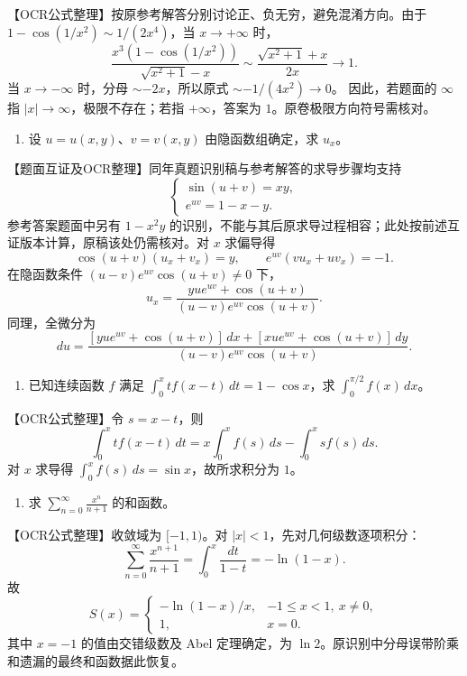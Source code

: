 \documentclass[11pt,fontset=fandol]{ctexart}
\providecommand{\tightlist}{\setlength{\itemsep}{0pt}\setlength{\parskip}{0pt}}
\begin{document}
【OCR公式整理】按原参考解答分别讨论正、负无穷，避免混淆方向。由于
\(1-\cos(1/x^2)\sim1/(2x^4)\)，当 \(x\to+\infty\) 时， \[
\frac{x^3(1-\cos(1/x^2))}{\sqrt{x^2+1}-x}
\sim\frac{\sqrt{x^2+1}+x}{2x}\longrightarrow1.
\] 当 \(x\to-\infty\) 时，分母 \(\sim-2x\)，所以原式
\(\sim-1/(4x^2)\to0\)。 因此，若题面的 \(\infty\) 指
\(|x|\to\infty\)，极限不存在；若指 \(+\infty\)，答案为
\(1\)。原卷极限方向符号需核对。

\begin{enumerate}
\def\labelenumi{\arabic{enumi}.}
\setcounter{enumi}{1}
\tightlist
\item
  设 \(u=u(x,y)\)、\(v=v(x,y)\) 由隐函数组确定，求 \(u_x\)。
\end{enumerate}

【题面互证及OCR整理】同年真题识别稿与参考解答的求导步骤均支持 \[
\begin{cases}\sin(u+v)=xy,\\e^{uv}=1-x-y.\end{cases}
\] 参考答案题面中另有 \(1-x^2y\)
的识别，不能与其后原求导过程相容；此处按前述互证版本计算，原稿该处仍需核对。对
\(x\) 求偏导得 \[
\cos(u+v)(u_x+v_x)=y,\qquad
e^{uv}(vu_x+uv_x)=-1.
\] 在隐函数条件 \((u-v)e^{uv}\cos(u+v)\ne0\) 下， \[
u_x=\frac{yu e^{uv}+\cos(u+v)}{(u-v)e^{uv}\cos(u+v)}.
\] 同理，全微分为 \[
du=\frac{[yu e^{uv}+\cos(u+v)]\,dx+[xu e^{uv}+\cos(u+v)]\,dy}
{(u-v)e^{uv}\cos(u+v)}.
\]

\begin{enumerate}
\def\labelenumi{\arabic{enumi}.}
\setcounter{enumi}{2}
\tightlist
\item
  已知连续函数 \(f\) 满足 \(\int_0^x tf(x-t)\,dt=1-\cos x\)，求
  \(\int_0^{\pi/2}f(x)\,dx\)。
\end{enumerate}

【OCR公式整理】令 \(s=x-t\)，则 \[
\int_0^x tf(x-t)\,dt
=x\int_0^x f(s)\,ds-\int_0^x sf(s)\,ds.
\] 对 \(x\) 求导得 \(\int_0^x f(s)\,ds=\sin x\)，故所求积分为 \(1\)。

\begin{enumerate}
\def\labelenumi{\arabic{enumi}.}
\setcounter{enumi}{3}
\tightlist
\item
  求 \(\displaystyle\sum_{n=0}^\infty\frac{x^n}{n+1}\) 的和函数。
\end{enumerate}

【OCR公式整理】收敛域为 \([-1,1)\)。对 \(|x|<1\)，先对几何级数逐项积分：
\[
\sum_{n=0}^\infty\frac{x^{n+1}}{n+1}
=\int_0^x\frac{dt}{1-t}=-\ln(1-x).
\] 故 \[
S(x)=\begin{cases}
-\ln(1-x)/x,&-1\le x<1,\ x\ne0,\\
1,&x=0.
\end{cases}
\] 其中 \(x=-1\) 的值由交错级数及 Abel 定理确定，为
\(\ln2\)。原识别中分母误带阶乘和遗漏的最终和函数据此恢复。
\end{document}
